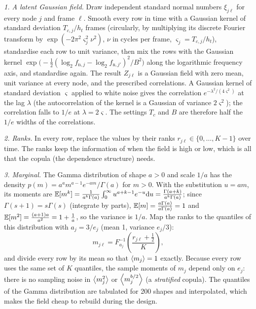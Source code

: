 \emph{1. A latent Gaussian field.} Draw independent standard normal numbers $\xi_{j\ell}$ for every
node $j$ and frame $\ell$. Smooth every row in time with a Gaussian kernel of standard deviation
$T_{c,j}/h_t$ frames (circularly, by multiplying its discrete Fourier transform by
$\exp(-2\pi^2\varsigma_j^2\nu^2)$, $\nu$ in cycles per frame, $\varsigma_j = T_{c,j}/h_t$), standardise
each row to unit variance, then mix the rows with the Gaussian kernel
$\exp\bigl(-\tfrac12(\log_2f_{\mathrm{n},j}-\log_2f_{\mathrm{n},j'})^2/B^2\bigr)$ along the logarithmic
frequency axis, and standardise again. The result $Z_{j\ell}$ is a Gaussian field with zero mean, unit
variance at every node, and the prescribed correlations. A Gaussian kernel of standard deviation
$\varsigma$ applied to white noise gives the correlation $e^{-\lambda^2/(4\varsigma^2)}$ at the lag
$\lambda$ (the autocorrelation of the kernel is a Gaussian of variance $2\varsigma^2$); the correlation
falls to $1/e$ at $\lambda = 2\varsigma$. The settings $T_c$ and $B$ are therefore half the $1/e$
widths of the correlations.

\emph{2. Ranks.} In every row, replace the values by their ranks $r_{j\ell}\in\{0,\dots,K-1\}$ over
time. The ranks keep the information of when the field is high or low, which is all that the copula
(the dependence structure) needs.

\emph{3. Marginal.} The Gamma distribution of shape $a>0$ and scale $1/a$ has the density
$p(m) = a^a m^{a-1}e^{-am}/\Gamma(a)$ for $m>0$. With the substitution $u = am$, its moments are
$\mathbb{E}[m^k] = \frac{1}{a^k\Gamma(a)}\int_0^\infty u^{a+k-1}e^{-u}\mathrm{d} u = \frac{\Gamma(a+k)}{a^k\Gamma(a)}$;
since $\Gamma(s+1) = s\Gamma(s)$ (integrate by parts), $\mathbb{E}[m] = \frac{a\Gamma(a)}{a\Gamma(a)} = 1$ and
$\mathbb{E}[m^2] = \frac{(a+1)a}{a^2} = 1+\frac1a$, so the variance is $1/a$. Map the ranks to the quantiles of
this distribution with $a_j = 3/e_j$ (mean 1, variance $e_j/3$):
\begin{equation}\label{eq:gammafield}
  m_{j\ell} = F^{-1}_{a_j}\!\left(\frac{r_{j\ell}+\tfrac12}{K}\right),
\end{equation}
and divide every row by its mean so that $\left\langle m_j \right\rangle = 1$ exactly. Because every row uses the same set
of $K$ quantiles, the sample moments of $m_j$ depend only on $e_j$: there is no sampling noise in
$\left\langle m_j^2 \right\rangle$ or $\left\langle m_j^{b/2} \right\rangle$ (a \emph{stratified} copula). The quantiles of the Gamma
distribution are tabulated for 200 shapes and interpolated, which makes the field cheap to rebuild
during the design.

